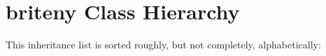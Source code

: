 \section{briteny Class Hierarchy}
This inheritance list is sorted roughly, but not completely, alphabetically:\begin{CompactList}
\item {}
\item {}
\end{CompactList}
